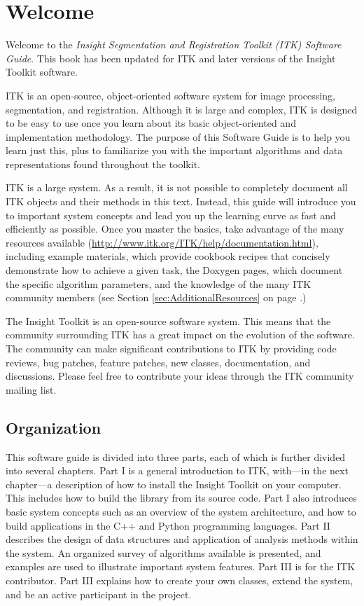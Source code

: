 \chapter{Welcome}
\label{chapter:Introduction}

Welcome to the \emph{Insight Segmentation and Registration Toolkit (ITK)
Software Guide}. This book has been updated for ITK \ITKVERSIONMAJORMINOR
and later versions of the Insight Toolkit software.

ITK is an open-source, object-oriented software system for image processing,
segmentation, and registration.  Although it is large and complex, ITK is
designed to be easy to use once you learn about its basic object-oriented and
implementation methodology. The purpose of this Software Guide is
to help you learn just this, plus to familiarize you with the important
algorithms and data representations found throughout the toolkit.

ITK is a large system. As a result, it is not possible to completely document
all ITK objects and their methods in this text. Instead, this guide will
introduce you to important system concepts and lead you up the learning curve
as fast and efficiently as possible. Once you master the basics, take
advantage of the many resources available
(\url{http://www.itk.org/ITK/help/documentation.html}), including example
materials, which provide cookbook recipes that concisely demonstrate how to
achieve a given task, the Doxygen pages, which document the specific algorithm
parameters, and the knowledge of the many ITK community members (see Section
\ref{sec:AdditionalResources} on page \pageref{sec:AdditionalResources}.)

The Insight Toolkit is an open-source software system. This means that the
community surrounding ITK has a great impact on the evolution of the software.
The community can make significant contributions to ITK by providing code
reviews, bug patches, feature patches, new classes, documentation, and
discussions. Please feel free to contribute your ideas through the ITK
community mailing list.

\section{Organization}
\label{sec:Organization}

This software guide is divided into three parts, each of which is further
divided into several chapters. Part I is a general introduction to ITK,
with---in the next chapter---a description of how to install the Insight
Toolkit on your computer. This includes how to build the library from its
source code. Part I also introduces basic system concepts such as an overview
of the system architecture, and how to build applications in the C++ and
Python programming languages. Part II describes the design of data structures
and application of analysis methods within the system.  An organized survey of
algorithms available is presented, and examples are used to illustrate
important system features.  Part III is for the ITK contributor. Part III
explains how to create your own classes, extend the system, and be an active
participant in the project.

